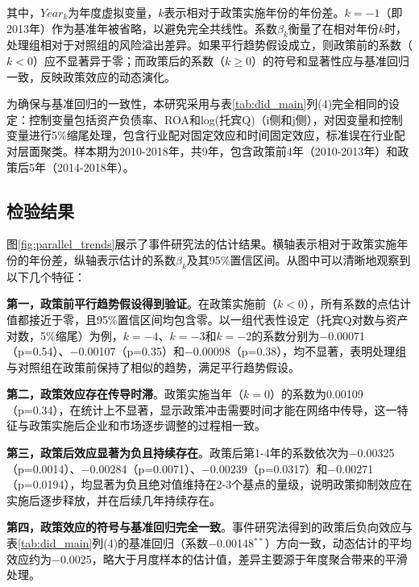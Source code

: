 其中，$Year_k$为年度虚拟变量，$k$表示相对于政策实施年份的年份差。$k=-1$（即2013年）作为基准年被省略，以避免完全共线性。系数$\beta_k$衡量了在相对年份$k$时，处理组相对于对照组的风险溢出差异。如果平行趋势假设成立，则政策前的系数（$k<0$）应不显著异于零；而政策后的系数（$k \geq 0$）的符号和显著性应与基准回归一致，反映政策效应的动态演化。

为确保与基准回归的一致性，本研究采用与表\ref{tab:did_main}列(4)完全相同的设定：控制变量包括资产负债率、ROA和log(托宾Q)（i侧和j侧），对因变量和控制变量进行5\%缩尾处理，包含行业配对固定效应和时间固定效应，标准误在行业配对层面聚类。样本期为2010-2018年，共9年，包含政策前4年（2010-2013年）和政策后5年（2014-2018年）。

\subsection{检验结果}

图\ref{fig:parallel_trends}展示了事件研究法的估计结果。横轴表示相对于政策实施年份的年份差，纵轴表示估计的系数$\beta_k$及其95\%置信区间。从图中可以清晰地观察到以下几个特征：

\textbf{第一，政策前平行趋势假设得到验证}。在政策实施前（$k<0$），所有系数的点估计值都接近于零，且95\%置信区间均包含零。以一组代表性设定（托宾Q对数与资产对数，5\%缩尾）为例，$k=-4$、$k=-3$和$k=-2$的系数分别为$-$0.00071（p=0.54）、$-$0.00107（p=0.35）和$-$0.00098（p=0.38），均不显著，表明处理组与对照组在政策前保持了相似的趋势，满足平行趋势假设。

\textbf{第二，政策效应存在传导时滞}。政策实施当年（$k=0$）的系数为0.00109（p=0.34），在统计上不显著，显示政策冲击需要时间才能在网络中传导，这一特征与政策实施后企业和市场逐步调整的过程相一致。

\textbf{第三，政策后效应显著为负且持续存在}。政策后第1-4年的系数依次为$-$0.00325（p=0.0014）、$-$0.00284（p=0.0071）、$-$0.00239（p=0.0317）和$-$0.00271（p=0.0194），均显著为负且绝对值维持在2-3个基点的量级，说明政策抑制效应在实施后逐步释放，并在后续几年持续存在。

\textbf{第四，政策效应的符号与基准回归完全一致}。事件研究法得到的政策后负向效应与表\ref{tab:did_main}列(4)的基准回归（系数$-$0.00148$^{**}$）方向一致，动态估计的平均效应约为$-$0.0025，略大于月度样本的估计值，差异主要源于年度聚合带来的平滑处理。


